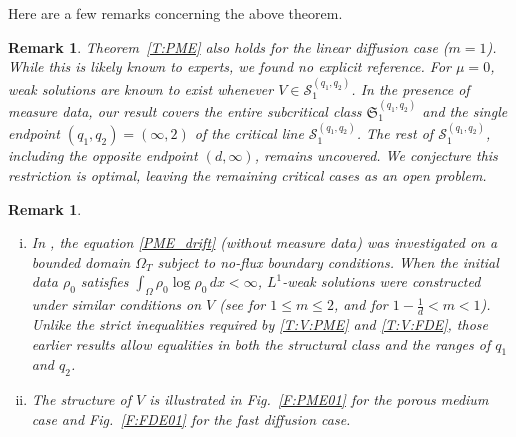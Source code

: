 \documentclass{amsart}
\newtheorem{remark}[defn]{Remark}
\numberwithin{equation}{section}
\begin{document}
Here are a few remarks concerning the above theorem.



 
\begin{remark}\label{m=1}
Theorem~\ref{T:PME} also holds for the linear diffusion case ($m=1$). While this is likely known to experts, we found no explicit reference. For $\mu=0$, weak solutions are known to exist whenever $V\in\mathcal{S}_{1}^{(q_{1},q_{2})}$. In the presence of measure data, our result covers the entire subcritical class $\mathfrak{S}_{1}^{(q_{1},q_{2})}$ and the single endpoint $(q_{1},q_{2})=(\infty,2)$ of the critical line $\mathcal{S}_{1}^{(q_1,q_2)}$. The rest of $\mathcal{S}_{1}^{(q_{1},q_{2})}$, including the opposite endpoint $(d,\infty)$, remains uncovered. We conjecture this restriction is optimal, leaving the remaining critical cases as an open problem.
\end{remark}



\begin{remark}\label{R:T:PME}
\begin{enumerate}[(i)]
    \item
    In \cite{HKK02,HKK_FDE}, the equation \eqref{PME_drift} (without measure data) was investigated on a bounded domain \(\Omega_{T}\) subject to no-flux boundary conditions.
    When the initial data \(\rho_0\) satisfies $\int_{\Omega} \rho_0 \log \rho_0 \, dx < \infty$,
    \(L^1\)-weak solutions were constructed under similar conditions on \(V\) (see \cite[Theorem~2.4]{HKK02} for \(1 \le m \le 2\), and \cite[Theorem~2.5]{HKK_FDE} for \(1 - \tfrac{1}{d} < m < 1\)).
    Unlike the strict inequalities required by \eqref{T:V:PME} and \eqref{T:V:FDE}, those earlier results allow equalities in both the structural class and the ranges of \(q_1\) and \(q_2\).
    
    \item
    The structure of \(V\) is illustrated in Fig.~\ref{F:PME01} for the porous medium case and Fig.~\ref{F:FDE01} for the fast diffusion case.
\end{enumerate}
\end{remark}
\end{document}
